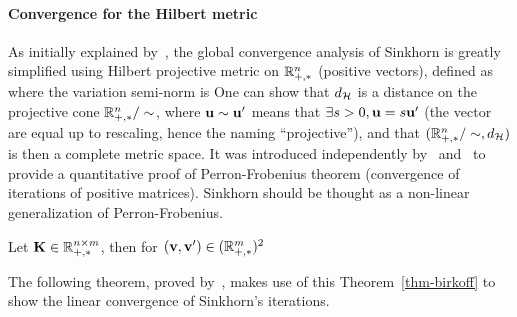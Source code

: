


\paragraph{Convergence for the Hilbert metric}

As initially explained by~\cite{franklin1989scaling}, the global convergence analysis of Sinkhorn is greatly simplified using Hilbert projective metric on $\mathbb{R}_{+,*}^n$ (positive vectors), defined as
where the variation semi-norm is
One can show that $d_{\mathcal{H}}$ is a distance on the projective cone $\mathbb{R}_{+,*}^n/\sim$, where $\mathrm{\textbf{\upshape u}} \sim \mathrm{\textbf{\upshape u}}'$ means that $\exists s>0, \mathrm{\textbf{\upshape u}}=s\mathrm{\textbf{\upshape u}}'$ (the vector are equal up to rescaling, hence the naming ``projective''), and that $(\mathbb{R}_{+,*}^n/\sim,d_{\mathcal{H}})$ is then a complete metric space.  
%
%
It was introduced independently by~\cite{birkhoff1957extensions} and~\cite{samelson1957perron} to provide a quantitative proof of Perron-Frobenius theorem (convergence of iterations of positive matrices). Sinkhorn should be thought as a non-linear generalization of Perron-Frobenius. 


\begin{thm}\label{thm-birkoff}
	Let $\mathrm{\textbf{\upshape K}} \in \mathbb{R}_{+,*}^{n \times m}$, then for $(\mathrm{\textbf{\upshape v}},\mathrm{\textbf{\upshape v}}') \in (\mathbb{R}_{+,*}^m)^2$
\end{thm}

The following theorem, proved by~\cite{franklin1989scaling}, makes use of this Theorem~\ref{thm-birkoff} to show the linear convergence of Sinkhorn's iterations.

